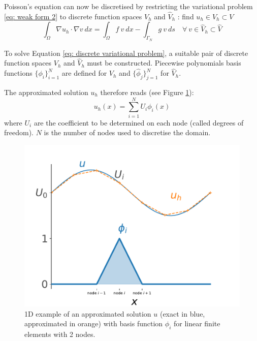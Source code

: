 Poisson's equation can now be discretised by restricting the variational problem \ref{eq: weak form 2} to discrete function spaces $V_h$ and $\hat{V}_h$ : find $u_h \in V_h \subset V$
\begin{equation}
    \int_{\Omega} \nabla u_h \cdot \nabla v  \ dx = \int_{\Omega} f \ v \ dx - \int_{\Gamma_N} g \ v \ ds \quad \forall \ v \in \hat{V}_h \subset \hat{V}
    \label{eq: discrete variational problem}
\end{equation}

To solve Equation \ref{eq: discrete variational problem}, a suitable pair of discrete function spaces $V_h$ and $\hat{V}_h$ must be constructed.
Piecewise polynomials basis functions $\{ \phi_i \}_{i=1}^N$ are defined for $V_h$ and $\{ \hat{\phi}_j \}_{j=1}^N$ for $\hat{V}_h$.

The approximated solution $u_h$ therefore reads (see Figure \ref{fig: example approximated solution}):
\begin{equation}
    u_h(x) = \sum^N_{i=1}U_i \phi_i(x)
    \label{eq: FEM solution}
\end{equation}
where $U_i$ are the coefficient to be determined on each node (called degrees of freedom).
$N$ is the number of nodes used to discretise the domain.

\begin{figure}
    \centering
    \includegraphics[width=\linewidth]{Figures/Chapter2/approximated_solution.pdf}
    \caption{1D example of an approximated solution $u$ (exact in blue, approximated in orange) with basis function $\phi_i$ for linear finite elements with 2 nodes.}
    \label{fig: example approximated solution}
\end{figure}

